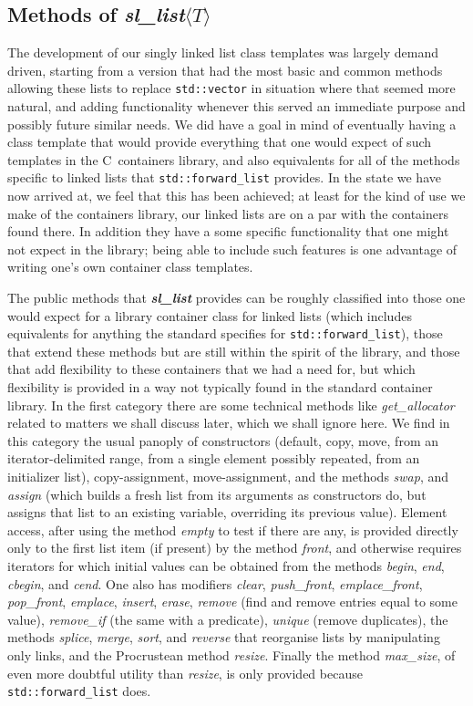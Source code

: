\documentclass[12pt]{article}
\theoremstyle{plain}
\theoremstyle{definition}
\def\PP{\copy\PPbox}
\newcommand\Cee{\textsc{C}}
\newcommand\Cpp{\Cee\PP}
\newcommand\std[1]{\texttt{std::#1}}
\def\frwl.{\std{forward\_list}}
\def\vect.{\std{vector}}
\def\slls.{\textbf{\textit{sl\_\!list}}}
\begin{document}
\subsection{Methods of \textbf{\textit{sl\_list}}$\langle T\rangle$}

The development of our singly linked list class templates was largely demand
driven, starting from a version that had the most basic and common
methods allowing these lists to replace \vect. in situation where that
seemed more natural, and adding functionality whenever this served an immediate
purpose and possibly future similar needs. We did have a goal in mind of
eventually having a class template that would provide everything that one would
expect of such templates in the \Cpp\ containers library, and also equivalents
for all of the methods specific to linked lists that \frwl. provides. In the
state we have now arrived at, we feel that this has been achieved; at least for
the kind of use we make of the containers library, our linked lists are on a par
with the containers found there. In addition they have a some specific
functionality that one might not expect in the library; being able to include
such features is one advantage of writing one's own container class templates.

The public methods that \slls. provides can be roughly classified into those one
would expect for a library container class for linked lists (which includes
equivalents for anything the standard specifies for \frwl.), those that extend
these methods but are still within the spirit of the library, and those that add
flexibility to these containers that we had a need for, but which flexibility is
provided in a way not typically found in the standard container library. In the
first category there are some technical methods like \textit{get\_\!allocator}
related to matters we shall discuss later, which we shall ignore here. We find
in this category the usual panoply of constructors (default, copy, move, from an
iterator-delimited range, from a single element possibly repeated, from an
initializer list), copy-assignment, move-assignment, and the methods
\textit{swap}, and \textit{assign} (which builds a fresh list from its arguments
as constructors do, but assigns that list to an existing variable, overriding
its previous value). Element access, after using the method \textit{empty} to
test if there are any, is provided directly only to the first list item (if
present) by the method \textit{front}, and otherwise requires iterators for
which initial values can be obtained from the methods \textit{begin},
\textit{end}, \textit{cbegin}, and \textit{cend}. One also has modifiers
\textit{clear}, \textit{push\_front}, \textit{emplace\_front},
\textit{pop\_front}, \textit{emplace}, \textit{insert}, \textit{erase},
\textit{remove} (find and remove entries equal to some value),
\textit{remove\_if} (the same with a predicate), \textit{unique} (remove
duplicates), the methods \textit{splice}, \textit{merge}, \textit{sort}, and
\textit{reverse} that reorganise lists by manipulating only links, and the
Procrustean method \textit{resize}. Finally the method \textit{max\_size}, of
even more doubtful utility than \textit{resize}, is only provided because \frwl.
does.
\end{document}
